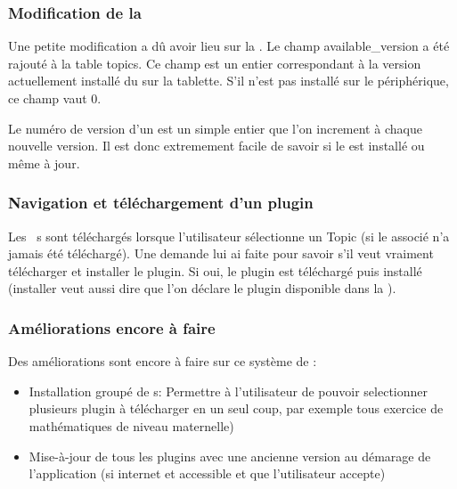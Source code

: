 \subsubsection{Modification de la \bdd{}}
Une petite modification a dû avoir lieu sur la \bdd{}. Le champ \og{}available\_version\fg{} a été rajouté à la table \og{}topics\fg{}. Ce champ est un entier correspondant à la version actuellement installé du \plugin{} sur la tablette. S'il n'est pas installé sur le périphérique, ce champ vaut \og{}$0$\fg{}.

Le numéro de version d'un \plugin{} est un simple entier que l'on increment à chaque nouvelle version. Il est donc extremement facile de savoir si le \plugin{} est installé ou même à jour.

\subsubsection{Navigation et téléchargement d'un plugin}
Les \plugin~s sont téléchargés lorsque l'utilisateur sélectionne un Topic (si le \plugin{} associé n'a jamais été téléchargé). Une demande lui ai faite pour savoir s'il veut vraiment télécharger et installer le plugin. 
Si oui, le plugin est téléchargé puis installé (installer veut aussi dire que l'on déclare le plugin disponible dans la \bdd{}).

\subsubsection{Améliorations encore à faire}
Des améliorations sont encore à faire sur ce système de \plugin{}:
\begin{itemize}
    \item Installation groupé de \plugin s:
    \newline Permettre à l'utilisateur de pouvoir selectionner plusieurs plugin à télécharger en un seul coup, par exemple tous exercice de mathématiques de niveau maternelle)
    \item Mise-à-jour de tous les plugins avec une ancienne version au démarage de l'application (si internet et accessible et que l'utilisateur accepte)
\end{itemize}
